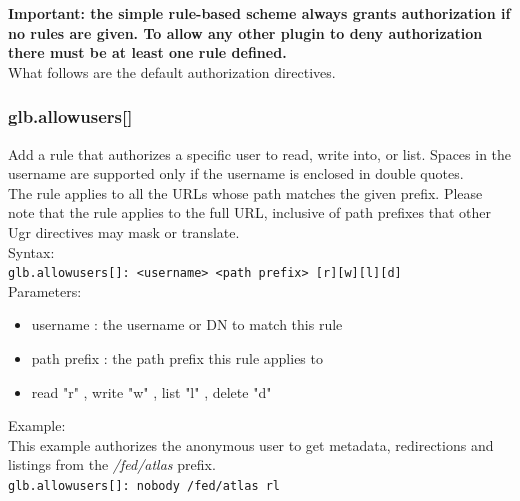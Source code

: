 \documentclass[12pt]{article} %
\begin{document}
\textbf{Important: the simple rule-based scheme always grants authorization if no rules are given. To allow any other plugin to deny authorization there must be at least one rule defined.}\\

What follows are the default authorization directives.\\

\subsubsection{glb.allowusers[]}
Add a rule that authorizes a specific user to read, write into, or list. Spaces in the username are supported only if the username is enclosed in double quotes.\\
The rule applies to all the URLs whose path matches the given prefix. Please note that the rule applies to the full URL, inclusive of path prefixes that other Ugr directives may mask or translate.\\
Syntax:\\
\lstinline"glb.allowusers[]: <username> <path prefix> [r][w][l][d]" \\

Parameters:\\
\begin{itemize}
 \item username : the username or DN to match this rule
 \item path prefix : the path prefix this rule applies to
 \item read "r" , write "w" , list "l" , delete "d"
\end{itemize}

Example:\\
This example authorizes the anonymous user to get metadata, redirections and listings from the \textit{/fed/atlas} prefix.\\
\lstinline"glb.allowusers[]: nobody /fed/atlas rl" \\
\end{document}
